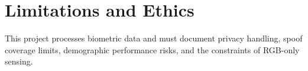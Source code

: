 \section{Limitations and Ethics}
This project processes biometric data and must document privacy handling, spoof coverage limits, demographic performance risks, and the constraints of RGB-only sensing.
